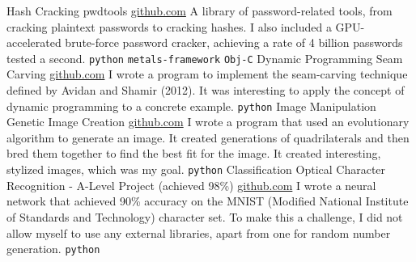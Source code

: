 \documentclass[9pt]{developercv} %
\begin{document}
\vspace{-20 pt}
\begin{entrylist}
    \entry
		{Hash Cracking}
		{pwdtools}
		{\href{https://github.com/JacobInwald/pwdtools}{github.com}}
		{
			A library of password-related tools, from cracking plaintext passwords to cracking hashes. 
			I also included a GPU-accelerated brute-force password cracker, achieving a rate of 4 billion passwords tested a second. 
			\newline
			\texttt{python} \slashsep \texttt{metals-framework} \slashsep \texttt{Obj-C}
		}
    \entry
		{Dynamic Programming}
		{Seam Carving}
		{\href{https://github.com/JacobInwald/Seam-Carving}{github.com}}
		{
			I wrote a program to implement the seam-carving technique defined by Avidan and Shamir (2012). 
		 	It was interesting to apply the concept of dynamic programming to a concrete example.
			 \newline
			 \texttt{python}
		}
	\entry
		{Image Manipulation}
		{Genetic Image Creation}
		{\href{https://github.com/JacobInwald/generative-image-making}{github.com}}
		{
			I wrote a program that used an evolutionary algorithm to generate an image. 
			It created generations of quadrilaterals and then bred them together to find the best fit for the image.
			It created interesting, stylized images, which was my goal. 
			\newline
			\texttt{python}
		}
    \entry
		{Classification}
		{Optical Character Recognition - A-Level Project (achieved 98\%)}
		{\href{https://github.com/JacobInwald/OCRAlgebra}{github.com}}
		{
			I wrote a neural network that achieved 90\% accuracy on the MNIST (Modified National Institute of Standards and Technology) character set. 
			To make this a challenge, I did not allow myself to use any external libraries, apart from one for random number generation.  
			\newline
			\texttt{python}
		}
\end{entrylist}
\end{document}
